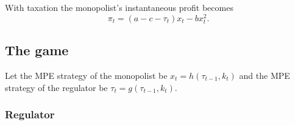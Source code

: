 \documentclass{amsart}
\begin{document}
With taxation the monopolist's instantaneous profit becomes
\begin{equation}
  \label{eq:24} \pi_t = (a-c-\tau_t)x_t - bx_t^2.
\end{equation}

\subsection{The game}
\label{sec:game}

Let the MPE strategy of the monopolist be $x_t = h(\tau_{t-1},k_t)$
and the MPE strategy of the regulator be $\tau_t = g(\tau_{t-1},k_t)$.

\subsubsection{Regulator}
\label{sec:regulator-1}
\end{document}
